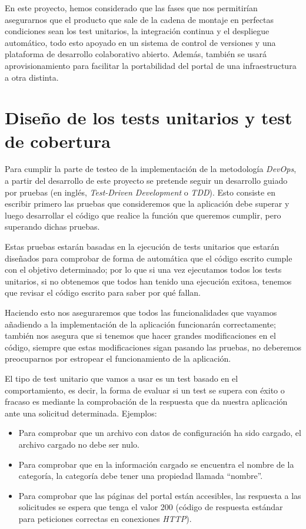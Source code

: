 \bigskip
En este proyecto, hemos considerado que las fases que nos permitirían asegurarnos que el producto que sale de la cadena de montaje en perfectas condiciones sean los test unitarios, la integración continua y el despliegue automático, todo esto apoyado en un sistema de control de versiones y una plataforma de desarrollo colaborativo abierto. Además, también se usará aprovisionamiento para facilitar la portabilidad del portal de una infraestructura a otra distinta. 

\section{Diseño de los tests unitarios y test de cobertura}

Para cumplir la parte de testeo de la implementación de la metodología \textit{DevOps}, a partir del desarrollo de este proyecto se pretende seguir un desarrollo guiado por pruebas (en inglés, \textit{Test-Driven Development} o \textit{TDD}). Esto consiste en escribir primero las pruebas que consideremos que la aplicación debe superar y luego desarrollar el código que realice la función que queremos cumplir, pero superando dichas pruebas. 

\bigskip
Estas pruebas estarán basadas en la ejecución de tests unitarios que estarán diseñados para comprobar de forma de automática que el código escrito cumple con el objetivo determinado; por lo que si una vez ejecutamos todos los tests unitarios, si no obtenemos que todos han tenido una ejecución exitosa, tenemos que revisar el código escrito para saber por qué fallan.

\bigskip
Haciendo esto nos aseguraremos que todos las funcionalidades que vayamos añadiendo a la implementación de la aplicación funcionarán correctamente; también nos asegura que si tenemos que hacer grandes modificaciones en el código, siempre que estas modificaciones sigan pasando las pruebas, no deberemos preocuparnos por estropear el funcionamiento de la aplicación.

\bigskip
El tipo de test unitario que vamos a usar es un test basado en el comportamiento, es decir, la forma de evaluar si un test se supera con éxito o fracaso es mediante la comprobación de la respuesta que da nuestra aplicación ante una solicitud 
determinada. Ejemplos:

\begin{itemize}
 \item Para comprobar que un archivo con datos de configuración ha sido cargado, el archivo cargado no debe ser nulo.
 \item Para comprobar que en la información cargado se encuentra el nombre de la categoría, la categoría debe tener una propiedad llamada ``nombre''.
 \item Para comprobar que las páginas del portal están accesibles, las respuesta a las solicitudes se espera que tenga el valor 200 (código de respuesta estándar para peticiones correctas en conexiones \textit{HTTP}).
\end{itemize}

